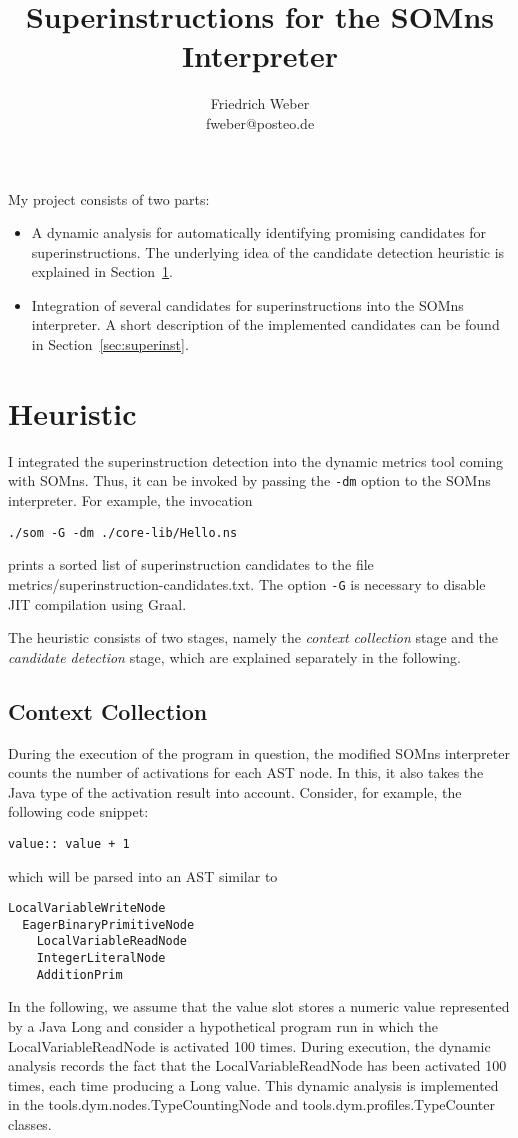 \documentclass[10pt,a4paper]{article}
\author{Friedrich Weber\\
\small fweber@posteo.de}
\title{Superinstructions for the SOMns Interpreter}
\begin{document}
	
\maketitle

My project consists of two parts:
\begin{itemize}
	\item A dynamic analysis for automatically identifying promising candidates for superinstructions. The underlying idea of the candidate detection heuristic is explained in Section~\ref{sec:heuristic}.
	\item Integration of several candidates for superinstructions into the SOMns interpreter. A short description of the implemented candidates can be found in Section~\ref{sec:superinst}.
\end{itemize}

\section{Heuristic}\label{sec:heuristic}

I integrated the superinstruction detection into the dynamic metrics tool coming with SOMns. Thus, it can be invoked by passing the \verb|-dm| option to the SOMns interpreter. For example, the invocation
\begin{verbatim}
./som -G -dm ./core-lib/Hello.ns
\end{verbatim}
prints a sorted list of superinstruction candidates to the file \textsf{metrics/superinstruction-candidates.txt}. The option \verb|-G| is necessary to disable JIT compilation using Graal.

The heuristic consists of two stages, namely the \emph{context collection} stage and the \emph{candidate detection} stage, which are explained separately in the following.

\subsection{Context Collection}

During the execution of the program in question, the modified SOMns interpreter counts the number of activations for each AST node. In this, it also takes the Java type of the activation result into account. Consider, for example, the following code snippet:
\begin{verbatim}
value:: value + 1
\end{verbatim}
which will be parsed into an AST similar to
\begin{verbatim}
LocalVariableWriteNode
  EagerBinaryPrimitiveNode
    LocalVariableReadNode
    IntegerLiteralNode
    AdditionPrim
\end{verbatim}
In the following, we assume that the \textsf{value} slot stores a numeric value represented by a Java \textsf{Long} and consider a hypothetical program run in which the \textsf{LocalVariableReadNode} is activated 100 times. During execution, the dynamic analysis records the fact that the \textsf{LocalVariableReadNode} has been activated 100 times, each time producing a \textsf{Long} value. This dynamic analysis is implemented in the \textsf{tools.dym.nodes.TypeCountingNode} and \textsf{tools.dym.profiles.TypeCounter} classes.
\end{document}
